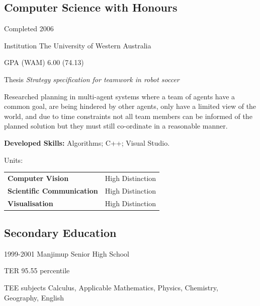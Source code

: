 \documentclass[10pt, a4paper]{report}
\begin{document}
\subsection*{Computer Science with Honours} %
	\begin{basedescript}{\desclabelstyle{\pushlabel}\desclabelwidth{11em}}
	\item[Completed] 2006
	\item[Institution] The University of Western Australia
	\item[GPA (WAM)] 6.00 (74.13)
	\item[Thesis] {\em Strategy specification for teamwork in robot soccer}
\end{basedescript}
Researched planning in multi-agent systems where a team of agents have a common goal, are being hindered by other agents, only have a limited view of the world, and due to time constraints not all team members can be informed of the planned solution but they must still co-ordinate in a reasonable manner.

{\bf Developed Skills:} Algorithms; C++; Visual Studio.
\begin{basedescript}{\desclabelstyle{\pushlabel}\desclabelwidth{5em}}
\item[Units:]

\begin{tabular}[h]{lr}
{\bf Computer Vision} & High Distinction\\
{\bf Scientific Communication} & High Distinction\\
{\bf Visualisation} & High Distinction\\
\end{tabular}
\end{basedescript}

\subsection*{Secondary Education}
	\begin{basedescript}{\desclabelstyle{\pushlabel}\desclabelwidth{13em}}
	\item[1999-2001] Manjimup Senior High School
	\item[TER] 95.55 percentile
	\item[TEE subjects] Calculus, Applicable Mathematics, Physics, Chemistry, \\ Geography, English
	\end{basedescript}
\end{document}
